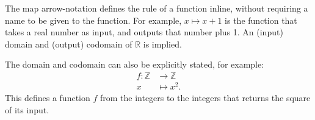 \documentclass[11pt,a4paper]{article}
\begin{document}
The map arrow-notation defines the rule of a function inline, 
without requiring a name to be given to the function. 
For example, 
\(x\mapsto x+1\) is the function that takes a real number as input, 
and outputs that number plus 1. 
An (input) domain and (output) codomain of \(\mathbb{R}\) is implied.

The domain and codomain can also be explicitly stated, 
for example:
\begin{align}
f : \mathbb{Z} & \rightarrow \mathbb{Z}\\
x &\mapsto x^2.
\end{align}
This defines a function \(f\) from the integers to the integers that returns the square of its input.
\end{document}

